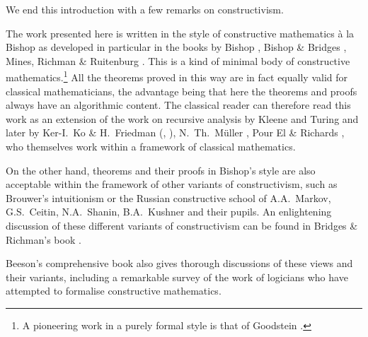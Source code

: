 \medskip We end this introduction with a few remarks on constructivism.

The work presented here is written in the style of constructive mathematics à la Bishop as developed in particular in the books by Bishop \cite{Bi}, Bishop \& Bridges \cite{BB}, Mines, Richman \& Ruitenburg \cite{mrr}. 
This is a kind of minimal body of constructive mathematics.\footnote{A pioneering work in a purely formal style is that of Goodstein \cite{Go1,Go}.}
All the theorems proved in this way are in fact equally valid for classical mathematicians, the advantage being that here the theorems and proofs always have an algorithmic content. 
The classical reader can therefore read this work as an extension of the work on recursive analysis by Kleene and Turing and later by Ker-I.\ Ko  \& H.\ Friedman (\cite{KF82}, \cite{Ko91}), N.\ Th.\ Müller \cite{Mu86,Mu87}, Pour El \& Richards \cite{PR}, who themselves work within a framework of classical mathematics.

On the other hand, theorems and their proofs in Bishop's style are also acceptable within the framework of other variants of constructivism, such as Brouwer's intuitionism or the Russian constructive school of A.A.\ Markov, G.S.\ Ceitin, N.A.\ Shanin, B.A.\ Kushner and their pupils. 
An enlightening discussion of these different variants of constructivism can be found in Bridges \& Richman's book \cite{BR}. 

Beeson's comprehensive book \cite{Be} also gives thorough discussions of these views and their variants, including a remarkable survey of the work of logicians who have attempted to formalise constructive mathematics. 

